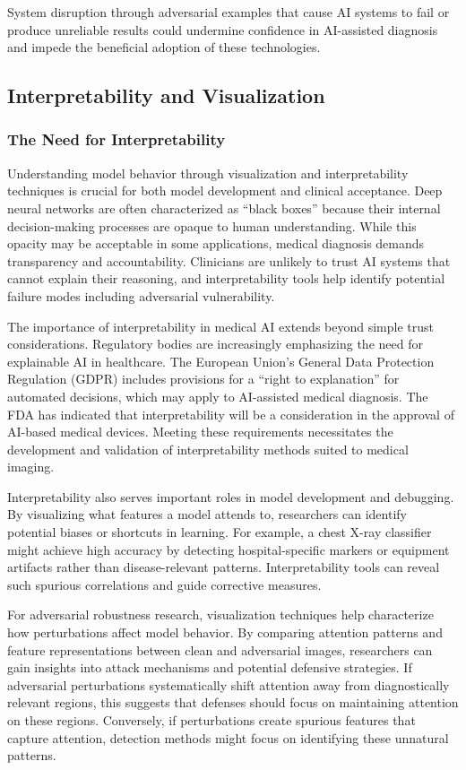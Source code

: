 \documentclass[12pt,a4paper]{article}
\begin{document}
System disruption through adversarial examples that cause AI systems to fail or produce unreliable results could undermine confidence in AI-assisted diagnosis and impede the beneficial adoption of these technologies.

\subsection{Interpretability and Visualization}

\subsubsection{The Need for Interpretability}

Understanding model behavior through visualization and interpretability techniques is crucial for both model development and clinical acceptance. Deep neural networks are often characterized as ``black boxes'' because their internal decision-making processes are opaque to human understanding. While this opacity may be acceptable in some applications, medical diagnosis demands transparency and accountability. Clinicians are unlikely to trust AI systems that cannot explain their reasoning, and interpretability tools help identify potential failure modes including adversarial vulnerability.

The importance of interpretability in medical AI extends beyond simple trust considerations. Regulatory bodies are increasingly emphasizing the need for explainable AI in healthcare. The European Union's General Data Protection Regulation (GDPR) includes provisions for a ``right to explanation'' for automated decisions, which may apply to AI-assisted medical diagnosis. The FDA has indicated that interpretability will be a consideration in the approval of AI-based medical devices. Meeting these requirements necessitates the development and validation of interpretability methods suited to medical imaging.

Interpretability also serves important roles in model development and debugging. By visualizing what features a model attends to, researchers can identify potential biases or shortcuts in learning. For example, a chest X-ray classifier might achieve high accuracy by detecting hospital-specific markers or equipment artifacts rather than disease-relevant patterns. Interpretability tools can reveal such spurious correlations and guide corrective measures.

For adversarial robustness research, visualization techniques help characterize how perturbations affect model behavior. By comparing attention patterns and feature representations between clean and adversarial images, researchers can gain insights into attack mechanisms and potential defensive strategies. If adversarial perturbations systematically shift attention away from diagnostically relevant regions, this suggests that defenses should focus on maintaining attention on these regions. Conversely, if perturbations create spurious features that capture attention, detection methods might focus on identifying these unnatural patterns.
\end{document}
